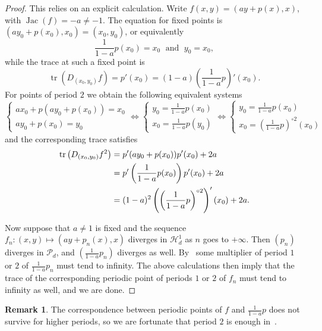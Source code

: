 \documentclass[oneside, 12pt]{amsart}
\newcommand{\unsur}[1]{\frac{1}{#1}}
\newcommand{\lrpar}[1]{\left(#1\right)}
\DeclareMathOperator{\tr}{tr}
\DeclareMathOperator{\jac}{Jac}
\theoremstyle{plain}
\theoremstyle{definition}
\newtheorem{rem}[thm]{Remark}
\numberwithin{equation}{section}       %
\numberwithin{equation}{section}       %
\begin{document}
\begin{proof}
This relies on an explicit calculation. Write 
$f (x,y)= (ay + p(x), x)$, with $\jac(f)  =-a\neq -1$. 
The equation for fixed points is $(ay_0  +p(x_0) , x_0) = (x_0,y_0)$, or equivalently 
\begin{equation}\label{eq:huguin_period1}
   \unsur{1-a}p(x_0) = x_0    \; {\text{ and }} \; y_0 = x_0,
 \end{equation}
while the trace at such a fixed point is 
\begin{equation}
\tr(D_{(x_0, y_0)}f) = p'(x_0) = (1-a) \lrpar{\unsur{1-a}p}'(x_0).
\end{equation}
For points of period $2$ we obtain the following equivalent systems
\begin{equation*}
\begin{cases}
ax_0  +p(ay_0+p(x_0))=x_0 \\
ay_0+p(x_0) = y_0
\end{cases} 
 \Leftrightarrow \begin{cases}   y_0 = \unsur{1-a}p(x_0) \\  x_0 = \unsur{1-a}p(y_0)  \end{cases}
\Leftrightarrow \begin{cases}   
y_0 = \unsur{1-a}p(x_0) \\ x_0= \lrpar{\unsur{1-a}p}^{\circ 2}(x_0)   
\end{cases}
\end{equation*}
and the corresponding trace satisfies
\begin{align}\label{eq:huguin_period2}
\tr \lrpar{D_{(x_0, y_0)}f^2} &= p'(ay_0+p(x_0))p'(x_0)+2a \\
&= p'\lrpar{\unsur{1-a}p(x_0)} p'(x_0)+2a \notag \\ 
&= \notag
(1-a)^2 \lrpar{\lrpar{\unsur{1-a}p}^{\circ 2}}'(x_0) + 2a.
\end{align}

Now suppose that $a\neq 1$ is fixed and the sequence $f_n \colon (x,y)\mapsto (ay+p_n(x), x)$ diverges in $\mathcal H^1_d$ as $n$ goes to $+\infty$. Then $(p_n)$ diverges in $\mathcal P_d$, 
and $\lrpar{\unsur{1-a}p_n}$ diverges as well. By~\cite[Thm A]{huguin:polynomials}  
some multiplier  of period $1$ or $2$ of $\unsur{1-a}p_n$ must tend to infinity. The above calculations then 
imply that the  trace  of the corresponding periodic point  of periods $1$ or $2$ of $f_n$ 
must tend to infinity as well, and we are done. 
\end{proof}

\begin{rem}
The correspondence between periodic points of $f$ and $\unsur{1-a}p$ does not   survive for higher periods, 
so we are fortunate that period $2$ is enough in~\cite{huguin:polynomials}. 
\end{rem}
\end{document}
